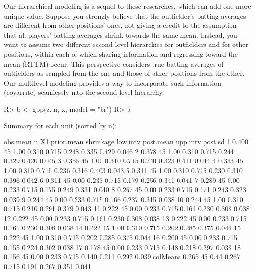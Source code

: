 \documentclass[article]{jss}
\begin{document}
Our hierarchical modeling is a sequel to these researches, which can add one more unique value. Suppose you strongly believe that the outfielder's batting averages are different from other positions' ones, not giving a credit to the assumption that all players' batting averages shrink towards the same mean. Instead, you want to assume two different second-level hierarchies for outfielders and for other positions, within each of which sharing information and regressing toward the mean (RTTM) occur. This perspective considers true batting averages of outfielders as sampled from the one and those of other positions from the other. Our multilevel modeling provides a way to incorporate such information (covariate) seamlessly into the second-level hierarchy.
\begin{CodeChunk}
\begin{CodeInput}
R> b <- gbp(z, n, x, model = "br")
R> b
\end{CodeInput}
\begin{CodeOutput}
Summary for each unit (sorted by n):

         obs.mean  n   X1 prior.mean shrinkage low.intv post.mean upp.intv post.sd
1           0.400 45 1.00      0.310     0.715    0.248     0.335    0.429   0.046
2           0.378 45 1.00      0.310     0.715    0.244     0.329    0.420   0.045
3           0.356 45 1.00      0.310     0.715    0.240     0.323    0.411   0.044
4           0.333 45 1.00      0.310     0.715    0.236     0.316    0.403   0.043
5           0.311 45 1.00      0.310     0.715    0.230     0.310    0.396   0.042
6           0.311 45 0.00      0.233     0.715    0.179     0.256    0.341   0.041
7           0.289 45 0.00      0.233     0.715    0.175     0.249    0.331   0.040
8           0.267 45 0.00      0.233     0.715    0.171     0.243    0.323   0.039
9           0.244 45 0.00      0.233     0.715    0.166     0.237    0.315   0.038
10          0.244 45 1.00      0.310     0.715    0.210     0.291    0.379   0.043
11          0.222 45 0.00      0.233     0.715    0.161     0.230    0.308   0.038
12          0.222 45 0.00      0.233     0.715    0.161     0.230    0.308   0.038
13          0.222 45 0.00      0.233     0.715    0.161     0.230    0.308   0.038
14          0.222 45 1.00      0.310     0.715    0.202     0.285    0.375   0.044
15          0.222 45 1.00      0.310     0.715    0.202     0.285    0.375   0.044
16          0.200 45 0.00      0.233     0.715    0.155     0.224    0.302   0.038
17          0.178 45 0.00      0.233     0.715    0.148     0.218    0.297   0.038
18          0.156 45 0.00      0.233     0.715    0.140     0.211    0.292   0.039
colMeans    0.265 45 0.44      0.267     0.715    0.191     0.267    0.351   0.041
\end{CodeOutput}
\end{CodeChunk}
\end{document}
